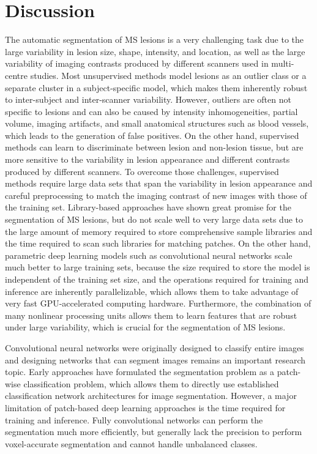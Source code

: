 \section{Discussion}

The automatic segmentation of MS lesions is a very challenging task due to the
large variability in lesion size, shape, intensity, and location, as well as the
large variability of imaging contrasts produced by different scanners used in
multi-centre studies. Most unsupervised methods model lesions as an outlier
class or a separate cluster in a subject-specific model, which makes them
inherently robust to inter-subject and inter-scanner variability. However,
outliers are often not specific to lesions and can also be caused by intensity
inhomogeneities, partial volume, imaging artifacts, and small anatomical
structures such as blood vessels, which leads to the generation of false
positives. On the other hand, supervised methods can learn to discriminate
between lesion and non-lesion tissue, but are more sensitive to the variability
in lesion appearance and different contrasts produced by different scanners. To
overcome those challenges, supervised methods require large data sets that span
the variability in lesion appearance and careful preprocessing to match the
imaging contrast of new images with those of the training set. Library-based
approaches have shown great promise for the segmentation of MS lesions, but do
not scale well to very large data sets due to the large amount of memory
required to store comprehensive sample libraries and the time required to scan
such libraries for matching patches. On the other hand, parametric deep learning
models such as convolutional neural networks scale much better to large training
sets, because the size required to store the model is independent of the
training set size, and the operations required for training and inference are
inherently parallelizable, which allows them to take advantage of very fast
GPU-accelerated computing hardware. Furthermore, the combination of many
nonlinear processing units allows them to learn features that are robust under
large variability, which is crucial for the segmentation of MS lesions.

Convolutional neural networks were originally designed to classify entire images
and designing networks that can segment images remains an important research
topic. Early approaches have formulated the segmentation problem as a patch-wise
classification problem, which allows them to directly use established
classification network architectures for image segmentation.
However, a major limitation of patch-based deep learning approaches is the time
required for training and inference. Fully convolutional networks can perform
the segmentation much more efficiently, but generally lack the precision to
perform voxel-accurate segmentation and cannot handle unbalanced classes.

